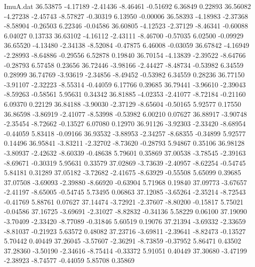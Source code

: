 \begin{filecontents}{ImuA.dat}
  36.53875   -4.17189   -2.41436   -8.46461   -0.51692    6.36849    0.22893
  36.56082   -4.27238   -2.45743   -8.57827   -0.30319    6.13950   -0.00006
  36.58393   -4.18983   -2.37368   -8.58904   -0.26503    6.22346   -0.04586
  36.60805   -4.12523   -2.37129   -8.46341   -0.60088    6.04027    0.13733
  36.63102   -4.16112   -2.43111   -8.46700   -0.57035    6.02500   -0.09929
  36.65520   -4.13480   -2.34138   -8.52084   -0.47875    6.46008   -0.03059
  36.67842   -4.16949   -2.28993   -8.64886   -0.29556    6.52878    0.19840
  36.70154   -4.13839   -2.39522   -8.64766   -0.28793    6.57458    0.23656
  36.72446   -3.98166   -2.44427   -8.48734   -0.53982    6.34559    0.28999
  36.74769   -3.93619   -2.34856   -8.49452   -0.53982    6.34559    0.28236
  36.77150   -3.91107   -2.32223   -8.55314   -0.44059    6.17766    0.39685
  36.79441   -3.96610   -2.39043   -8.59263   -0.58561    5.95631    0.34342
  36.81885   -4.02353   -2.41077   -8.72184   -0.21160    6.09370    0.22129
  36.84188   -3.90030   -2.37129   -8.65604   -0.50165    5.92577    0.17550
  36.86598   -3.86919   -2.41077   -8.53998   -0.53982    6.00210    0.07627
  36.88917   -3.90748   -2.35454   -8.72662   -0.13527    6.07080    0.12970
  36.91126   -3.92303   -2.33420   -8.68954   -0.44059    5.83418   -0.09166
  36.93532   -3.88953   -2.34257   -8.68355   -0.34899    5.92577    0.14496
  36.95841   -3.83211   -2.32702   -8.73620   -0.28793    5.94867    0.35106
  36.98128   -3.80937   -2.42632   -8.60339   -0.48638    5.79601    0.35869
  37.00538   -3.78545   -2.39163   -8.69671   -0.30319    5.95631    0.33579
  37.02869   -3.73639   -2.40957   -8.62254   -0.54745    5.84181    0.31289
  37.05182   -3.72682   -2.41675   -8.63929   -0.55508    5.65099    0.39685
  37.07508   -3.69093   -2.39880   -8.66920   -0.63904    5.71968    0.19840
  37.09773   -3.67657   -2.41197   -8.65005   -0.54745    5.73495    0.06863
  37.12085   -3.65264   -2.35214   -8.72543   -0.41769    5.88761    0.07627
  37.14474   -3.72921   -2.37607   -8.80200   -0.15817    5.75021   -0.04586
  37.16725   -3.69691   -2.31027   -8.82832   -0.34136    5.58229    0.06100
  37.19090   -3.70409   -2.33420   -8.77089   -0.31846    5.60519    0.19076
  37.21394   -3.69332   -2.33659   -8.81037   -0.21923    5.63572    0.48082
  37.23716   -3.69811   -2.39641   -8.82473   -0.13527    5.70442    0.40449
  37.26045   -3.57607   -2.36291   -8.73859   -0.37952    5.86471    0.43502
  37.28360   -3.50190   -2.34616   -8.75414   -0.33372    5.91051    0.40449
  37.30680   -3.47199   -2.38923   -8.74577   -0.44059    5.85708    0.35869

\end{filecontents}

